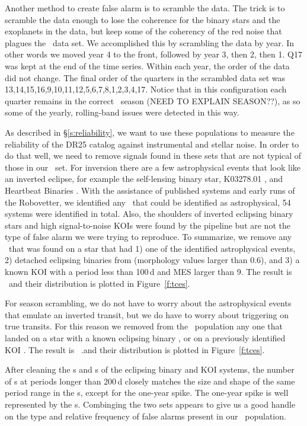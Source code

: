 Another method to create false alarm is to scramble the data.  The trick is to scramble the data enough to lose the coherence for the binary stars and the exoplanets in the data, but keep some of the coherency of the red noise that plagues the \Kepler\ data set.  We accomplished this by scrambling the data by year. In other words we moved year 4 to the front, followed by year 3, then 2, then 1. Q17 was kept at the end of the time series. Within each year, the order of the data did not change. The final order of the quarters in the scrambled data set was 13,14,15,16,9,10,11,12,5,6,7,8,1,2,3,4,17.  Notice that in this configuration each quarter remains in the correct \Kepler\ season (NEED TO EXPLAIN SEASON??), as so some of the yearly, rolling-band issues were detected in this way.

As described in \S\ref{s:reliability}, we want to use these populations to measure the reliability of the DR25 catalog against instrumental and stellar noise.  In order to do that well, we need to remove signals found in these sets that are not typical of those in our \opstce\ set.  For inversion there are a few astrophysical events that look like an inverted eclipse, for example the self-lensing binary star, K03278.01 \citep{Kruse2014}, and Heartbeat Binaries \citep{Thompson2012}.  With the assistance of published systems and early runs of the Robovetter, we identified any \invtce\ that could be identified as astrophysical, 54 systems were identified in total.  Also, the shoulders of inverted eclipsing binary stars and high signal-to-noise KOIs were found by the pipeline but are not the type of false alarm we were trying to reproduce.  To summarize, we remove any \invtce\ that was found on a star that had 1) one of the identified astrophysical events, 2) detached eclipsing binaries from \citet{Kirk2016} (morphology values larger than 0.6), and 3) a known KOI with a period less than 100\,d and MES larger than 9.  The result is \ninvtces\ \invtces and their distribution is plotted in Figure~\ref{f:tces}.

For season scrambling, we do not have to worry about the astrophysical events that emulate an inverted transit, but we do have to worry about triggering on true transits. For this reason we removed from the \scrtce\ population any one that landed on a star with a known eclipsing binary \citep{Kirk2016}, or on a previously identified KOI \citep{Coughlin2016}.  The result is \nscrtces\ \scrtce.and their distribution is plotted in Figure~\ref{f:tces}. 

After cleaning the \invtce s and \scrtce s of the eclipsing binary and KOI systems, the number of \scrtce s at periods longer than 200\,d closely matches the size and shape of the same period range in the \opstce s, except for the one-year spike.  The one-year spike is well represented by the \invtce s.  Combinging the two sets appears to give us a good handle on the type and relative frequency of false alarms present in our \opstce\ population.  

